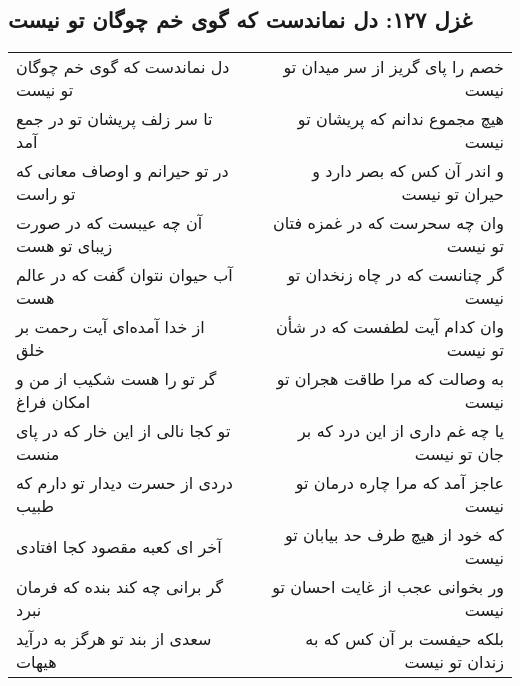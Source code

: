 \begin{center}
\section*{غزل ۱۲۷: دل نماندست که گوی خم چوگان تو نیست}
\label{sec:127}
\begin{longtable}{l p{0.5cm} r}
دل نماندست که گوی خم چوگان تو نیست
&&
خصم را پای گریز از سر میدان تو نیست
\\
تا سر زلف پریشان تو در جمع آمد
&&
هیچ مجموع ندانم که پریشان تو نیست
\\
در تو حیرانم و اوصاف معانی که تو راست
&&
و اندر آن کس که بصر دارد و حیران تو نیست
\\
آن چه عیبست که در صورت زیبای تو هست
&&
وان چه سحرست که در غمزه فتان تو نیست
\\
آب حیوان نتوان گفت که در عالم هست
&&
گر چنانست که در چاه زنخدان تو نیست
\\
از خدا آمده‌ای آیت رحمت بر خلق
&&
وان کدام آیت لطفست که در شأن تو نیست
\\
گر تو را هست شکیب از من و امکان فراغ
&&
به وصالت که مرا طاقت هجران تو نیست
\\
تو کجا نالی از این خار که در پای منست
&&
یا چه غم داری از این درد که بر جان تو نیست
\\
دردی از حسرت دیدار تو دارم که طبیب
&&
عاجز آمد که مرا چاره درمان تو نیست
\\
آخر ای کعبه مقصود کجا افتادی
&&
که خود از هیچ طرف حد بیابان تو نیست
\\
گر برانی چه کند بنده که فرمان نبرد
&&
ور بخوانی عجب از غایت احسان تو نیست
\\
سعدی از بند تو هرگز به درآید هیهات
&&
بلکه حیفست بر آن کس که به زندان تو نیست
\\
\end{longtable}
\end{center}
